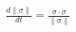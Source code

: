 \documentclass[preview]{standalone}
\begin{document}
\begin{align*}
\frac{d\|\sigma\|}{dt} = \frac{\sigma \cdot \dot{\sigma}}{\|\sigma\|}
\end{align*}
\end{document}
